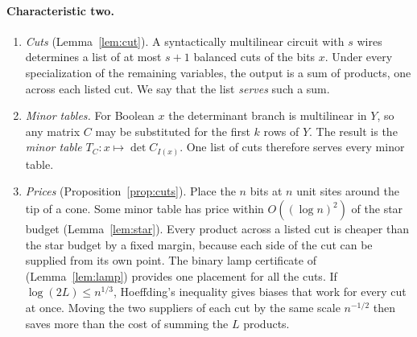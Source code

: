 \documentclass[11pt]{article}
\theoremstyle{remark}
\begin{document}
\paragraph{Characteristic two.}
\begin{enumerate}
\item \emph{Cuts} (Lemma~\ref{lem:cut}). A syntactically multilinear
circuit with \(s\) wires determines a list of at most \(s+1\) balanced
cuts of the bits \(x\). Under every specialization of the remaining
variables, the output is a sum of products, one across each listed cut.
We say that the list \emph{serves} such a sum.
\item \emph{Minor tables.} For Boolean \(x\) the determinant branch is
multilinear in \(Y\), so any matrix \(C\) may be substituted for the
first \(k\) rows of \(Y\). The result is the \emph{minor table}
\(T_C\colon x\mapsto\det C_{I(x)}\). One list of cuts therefore serves
every minor table.
\item \emph{Prices} (Proposition~\ref{prop:cuts}). Place the \(n\) bits at
\(n\) unit sites around the tip of a cone. Some minor table has price
within \(O((\log n)^2)\) of the star budget (Lemma~\ref{lem:star}). Every
product across a listed cut is cheaper than the star budget by a fixed
margin, because each side of the cut can be supplied from its own point.
The binary lamp certificate of \cite{hc} (Lemma~\ref{lem:lamp}) provides
one placement for all the cuts. If \(\log(2L)\le n^{1/3}\), Hoeffding's
inequality gives biases that work for every cut at once. Moving the two
suppliers of each cut by the same scale \(n^{-1/2}\) then saves more than
the cost of summing the \(L\) products.
\end{enumerate}
\end{document}
